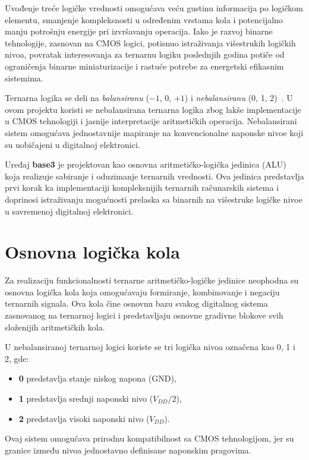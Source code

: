 \documentclass[conference,a4paper]{IEEEtran}
\begin{document}
Uvođenje treće logičke vrednosti omogućava veću gustinu informacija po logičkom elementu, smanjenje kompleksnosti u određenim vrstama kola i potencijalno manju potrošnju energije pri izvršavanju operacija. Iako je razvoj binarne tehnologije, zasnovan na CMOS logici, potisnuo istraživanja višestrukih logičkih nivoa, povratak interesovanja za ternarnu logiku poslednjih godina potiče od ograničenja binarne miniaturizacije i rastuće potrebe za energetski efikasnim sistemima.

Ternarna logika se deli na \textit{balansiranu} ($-1$, 0, $+1$) i \textit{nebalansiranu} (0, 1, 2)~\cite{jones_logic}. U ovom projektu koristi se nebalansirana ternarna logika zbog lakše implementacije u CMOS tehnologiji i jasnije interpretacije aritmetičkih operacija. Nebalansirani sistem omogućava jednostavnije mapiranje na konvencionalne naponske nivoe koji su uobičajeni u digitalnoj elektronici.

Uređaj \textbf{base3} je projektovan kao osnovna aritmetičko-logička jedinica (ALU) koja realizuje sabiranje i oduzimanje ternarnih vrednosti. Ova jedinica predstavlja prvi korak ka implementaciji kompleksnijih ternarnih računarskih sistema i doprinosi istraživanju mogućnosti prelaska sa binarnih na višestruke logičke nivoe u savremenoj digitalnoj elektronici.

	
	\section{Osnovna logička kola}
	
	Za realizaciju funkcionalnosti ternarne aritmetičko-logičke jedinice neophodna su osnovna logička kola koja omogućavaju formiranje, kombinovanje i negaciju ternarnih signala. Ova kola čine osnovnu bazu svakog digitalnog sistema zasnovanog na ternarnoj logici i predstavljaju osnovne gradivne blokove svih složenijih aritmetičkih kola.
	
	U nebalansiranoj ternarnoj logici koriste se tri logička nivoa označena kao 0, 1 i 2, gde:
	\begin{itemize}
		\item \textbf{0} predstavlja stanje niskog napona (GND),
		\item \textbf{1} predstavlja srednji naponski nivo ($V_{DD}/2$),
		\item \textbf{2} predstavlja visoki naponski nivo ($V_{DD}$).
	\end{itemize}
	
	Ovaj sistem omogućava prirodnu kompatibilnost sa CMOS tehnologijom, jer su granice između nivoa jednostavno definisane naponskim pragovima.
	
\end{document}
